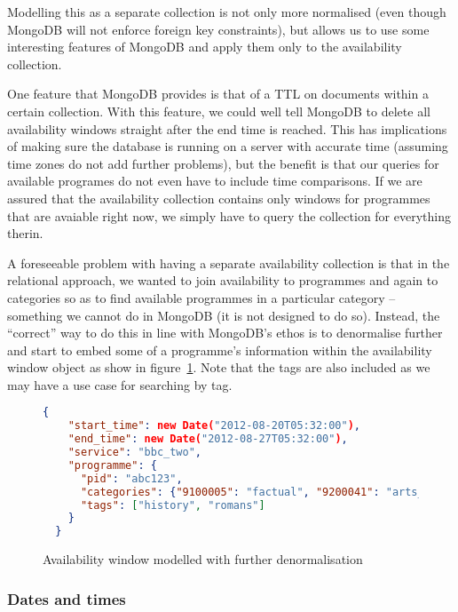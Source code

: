 \documentclass[11pt,a4paper]{article}
\begin{document}
Modelling this as a separate collection is not only more
normalised (even though MongoDB will not enforce foreign key
constraints), but allows us to use some interesting features
of MongoDB and apply them only to the availability collection.

One feature that MongoDB provides is that of a TTL on documents
within a certain collection. \cite{mongo-expiry} With this
feature, we could well tell MongoDB to delete all availability
windows straight after the end time is reached. This has implications
of making sure the database is running on a server with accurate
time (assuming time zones do not add further problems), but the
benefit is that our queries for available programes do not even
have to include time comparisons. If we are assured that the
availability collection contains only windows for programmes
that are avaiable right now, we simply have to query the collection
for everything therin.

A foreseeable problem with having a separate availability
collection is that in the relational approach, we wanted to join
availability to programmes and again to categories so as to find
available programmes in a particular category -- something we
cannot do in MongoDB (it is not designed to do so). Instead,
the ``correct'' way to do this in line with MongoDB's ethos
is to denormalise further and start to embed some of a
programme's information within the availability window
object as show in figure~\ref{fig:mongo-availability-denormal}.
Note that the tags are also included as we may have a use
case for searching by tag.

\begin{figure}[p]
\begin{lstlisting}[language=json]
  {
    "start_time": new Date("2012-08-20T05:32:00"),
    "end_time": new Date("2012-08-27T05:32:00"),
    "service": "bbc_two",
    "programme": {
      "pid": "abc123",
      "categories": {"9100005": "factual", "9200041": "arts_culture_and_the_media"},
      "tags": ["history", "romans"]
    }
  }
\end{lstlisting}
  \caption{Availability window modelled with further denormalisation}
  \label{fig:mongo-availability-denormal}
\end{figure}

\subsubsection{Dates and times}
\end{document}

